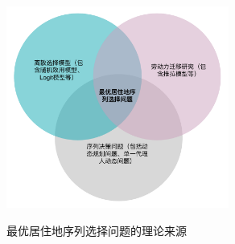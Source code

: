 \documentclass[a4paper, zihao=-4, fontset = mac, oneside]{ctexbook} %
\begin{document}
\begin{figure}[!ht]
\centering
\caption{最优居住地序列选择问题的理论来源}
\includegraphics[width=0.65\textwidth]{images/optimal_residential_sequence.drawio.pdf}
\label{fig:最优居住地序列选择问题的理论来源venn diagram}
\end{figure}





















\printbibliography[heading=bibliography,title=参考文献]
\end{document}
